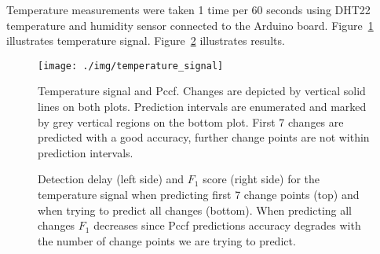 Temperature measurements were taken 1 time per 60 seconds using DHT22 temperature and humidity sensor connected to the Arduino board.
Figure~\ref{fig:temperature_signal} illustrates temperature signal.
Figure~\ref{fig:performance_temperature_signal} illustrates results.
\begin{figure}[!htb]
	\centering
	\texttt{[image: ./img/temperature\_signal]}
	\caption{
    Temperature signal and Pccf.
    Changes are depicted by vertical solid lines on both plots.
    Prediction intervals are enumerated and marked by grey vertical regions on the bottom plot. First 7 changes are predicted with a good accuracy, further change points are not within prediction intervals.
  }
	\label{fig:temperature_signal}
\end{figure}
\begin{figure}[!htb]
		\centering
  \caption{Detection delay (left side) and $F_1$ score (right side) for the temperature signal when predicting first 7 change points (top) and when trying to predict all changes (bottom). 
  When predicting all changes $F_1$ decreases since Pccf predictions accuracy degrades with the number of change points we are trying to predict. 
  }
	\label{fig:performance_temperature_signal}
\end{figure}

